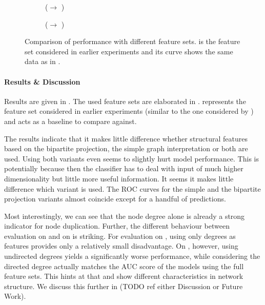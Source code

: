 \documentclass[
	fontsize=10pt, %
	twoside=false, %
	secnumdepth=1, %
  toc=indentunnumbered %
]{kaobook}
\begin{document}
\begin{figure}[h]
  \centering
  \begin{subfigure}{0.48\linewidth}
    \caption{(\ADLast $\rightarrow$ \PDMap)}
  \end{subfigure}
  \begin{subfigure}{0.48\linewidth}
    \caption{(\ADLast $\rightarrow$ \ReconMap{})}
  \end{subfigure}
  \caption[Comparison of performance with different feature sets.]{Comparison of
    performance with different feature sets.  is the
    feature set considered in earlier experiments and its curve shows the same
    data as in .}
  \label{fig:feature-importance}
\end{figure}


\paragraph{Results \& Discussion} Results are given in
. The used feature sets are elaborated in
.  represents the feature set
considered in earlier experiments (similar to the one considered by \nielsen{})
and acts as a baseline to compare against.

The results indicate that it makes little difference whether structural features
based on the bipartite projection, the simple graph interpretation or both are
used. Using both variants even seems to slightly hurt model performance. This is
potentially because then the classifier has to deal with input of much higher
dimensionality but little more useful information.
%
It seems it makes little difference which variant is used. The ROC curves for the simple
and the bipartite projection variants almost coincide except for a handful of
predictions.

Most interestingly, we can see that the node degree alone is already a strong
indicator for node duplication. Further, the different behaviour between
evaluation on \PDMap{} and on \ReconMap{} is striking. 
For evaluation on \PDMap{}, using only degrees as
features provides only a relatively small disadvantage. On \ReconMap{}, however,
using undirected degrees yields a significantly worse performance, while
considering the directed degree actually matches the AUC score of the models
using the full feature sets. This hints at that \PDMap{} and \ReconMap{} show
different characteristics in network structure. We discuss this further in (TODO
ref either Discussion or Future Work).
\end{document}
